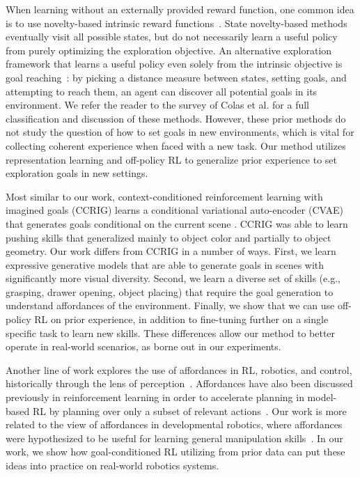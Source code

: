 \documentclass[letterpaper, 10 pt, conference]{ieeeconf}  %
\begin{document}
When learning without an externally provided reward function, one common idea is to use novelty-based intrinsic reward functions~\cite{chentanez2005intrinsically, lopes2012exploration, bellemare2016unifying, houthooft2016vime, stadie2016exploration, pathak2017curiosity}.
State novelty-based methods eventually visit all possible states, but do not necessarily learn a useful policy from purely optimizing the exploration objective.
An alternative exploration framework that learns a useful policy even solely from the intrinsic objective is goal reaching~\cite{kaelbling1993goals, schaul2015uva, Baranes2012, andrychowicz2017her, nair2018rig, nachum2018hiro, held2018goalgan, Pere2018, wadefarley2019discern, pong2020skewfit}: by picking a distance measure between states, setting goals, and attempting to reach them, an agent can discover all potential goals in its environment.
We refer the reader to the survey of Colas et al. \cite{colas2021gepsurvey} for a full classification and discussion of these methods.
However, these prior methods do not study the question of how to set goals in new environments, which is vital for collecting coherent experience when faced with a new task.
Our method utilizes representation learning and off-policy RL to generalize prior experience to set exploration goals in new settings.

Most similar to our work, context-conditioned reinforcement learning with imagined goals (CCRIG) learns a conditional variational auto-encoder (CVAE)~\cite{sohn2015cvae} that generates goals conditional on the current scene \cite{nair2019ccrig}. CCRIG was able to learn pushing skills that generalized mainly to object color and partially to object geometry. Our work differs from CCRIG in a number of ways. First, we learn expressive generative models that are able to generate goals in scenes with significantly more visual diversity. Second, we learn a diverse set of skills (e.g., grasping, drawer opening, object placing) that require the goal generation to understand affordances of the environment. Finally, we show that we can use off-policy RL on prior experience, in addition to fine-tuning further on a single specific task to learn new skills. These differences allow our method to better operate in real-world scenarios, as borne out in our experiments.

Another line of work explores the use of affordances in RL, robotics, and control, historically through the lens of perception~\cite{zech2017affordances, hassanin2018affordances, yamanobe2018affordances}. Affordances have also been discussed previously in reinforcement learning in order to accelerate planning in model-based RL by planning over only a subset of relevant actions~\cite{abel2014affordances, khetarpal2020affordances, xu2021affordances}. Our work is more related to the view of affordances in developmental robotics, where affordances were hypothesized to be useful for learning general manipulation skills~\cite{hart2010affordances, min2016affordances}. In our work, we show how goal-conditioned RL utilizing from prior data can put these ideas into practice on real-world robotics systems.
\end{document}
